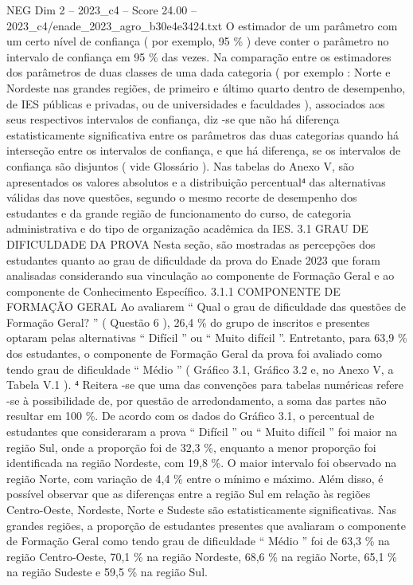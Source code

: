 \begin{textsample}{NEG Dim 2 – 2023\_c4 – Score 24.00 – 2023\_c4/enade\_2023\_agro\_b30e4e3424.txt}
O estimador de um parâmetro com um certo nível de confiança ( por exemplo, 95 \% ) deve conter o parâmetro no intervalo de confiança em 95 \% das vezes.
Na comparação entre os estimadores dos parâmetros de duas classes de uma dada categoria ( por exemplo : Norte e Nordeste nas grandes regiões, de primeiro e último quarto dentro de desempenho, de IES públicas e privadas, ou de universidades e faculdades ), associados aos seus respectivos intervalos de confiança, diz -se que não há diferença estatisticamente significativa entre os parâmetros das duas categorias quando há interseção entre os intervalos de confiança, e que há diferença, se os intervalos de confiança são disjuntos ( vide Glossário ).
Nas tabelas do Anexo V, são apresentados os valores absolutos e a distribuição percentual⁴ das alternativas válidas das nove questões, segundo o mesmo recorte de desempenho dos estudantes e da grande região de funcionamento do curso, de categoria administrativa e do tipo de organização acadêmica da IES. 3.1 GRAU DE DIFICULDADE DA PROVA Nesta seção, são mostradas as percepções dos estudantes quanto ao grau de dificuldade da prova do Enade 2023 que foram analisadas considerando sua vinculação ao componente de Formação Geral e ao componente de Conhecimento Específico. 3.1.1 COMPONENTE DE FORMAÇÃO GERAL Ao avaliarem “ Qual o grau de dificuldade das questões de Formação Geral? ” ( Questão 6 ), 26,4 \% do grupo de inscritos e presentes optaram pelas alternativas “ Difícil ” ou “ Muito difícil ”.
Entretanto, para 63,9 \% dos estudantes, o componente de Formação Geral da prova foi avaliado como tendo grau de dificuldade “ Médio ” ( Gráfico 3.1, Gráfico 3.2 e, no Anexo V, a Tabela V.1 ). ⁴ Reitera -se que uma das convenções para tabelas numéricas refere -se à possibilidade de, por questão de arredondamento, a soma das partes não resultar em 100 \%.
De acordo com os dados do Gráfico 3.1, o percentual de estudantes que consideraram a prova “ Difícil ” ou “ Muito difícil ” foi maior na região Sul, onde a proporção foi de 32,3 \%, enquanto a menor proporção foi identificada na região Nordeste, com 19,8 \%.
O maior intervalo foi observado na região Norte, com variação de 4,4 \% entre o mínimo e máximo.
Além disso, é possível observar que as diferenças entre a região Sul em relação às regiões Centro-Oeste, Nordeste, Norte e Sudeste são estatisticamente significativas.
Nas grandes regiões, a proporção de estudantes presentes que avaliaram o componente de Formação Geral como tendo grau de dificuldade “ Médio ” foi de 63,3 \% na região Centro-Oeste, 70,1 \% na região Nordeste, 68,6 \% na região Norte, 65,1 \% na região Sudeste e 59,5 \% na região Sul.

\end{textsample}
